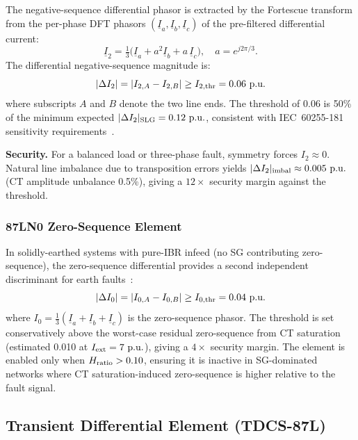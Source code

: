 \documentclass[journal,twoside,10pt]{IEEEtran}
\newcommand{\pu}{\,\text{p.u.}}
\begin{document}
The negative-sequence differential phasor is extracted by the Fortescue
transform from the per-phase DFT phasors $(\underline{I}_a, \underline{I}_b,
\underline{I}_c)$ of the pre-filtered differential current:
\begin{equation}
  \underline{I}_2 = \tfrac{1}{3}\bigl(
    \underline{I}_a + a^2\underline{I}_b + a\,\underline{I}_c\bigr),
  \quad a = e^{j2\pi/3}.
  \label{eq:fortescue}
\end{equation}
The differential negative-sequence magnitude is:
\begin{equation}
  |\Delta I_2| = |{I}_{2,A} - {I}_{2,B}| \geq I_{2,\rm thr} = 0.06\,\pu
  \label{eq:87LN}
\end{equation}
where subscripts $A$ and $B$ denote the two line ends.
The threshold of 0.06\,\pu is 50\% of the minimum expected
$|\Delta I_2|_{\rm SLG} = 0.12\,\pu$, consistent with IEC~60255-181
sensitivity requirements~\cite{IEC_60255_181}.

\textbf{Security.}  For a balanced load or three-phase fault, symmetry
forces $I_2 \approx 0$.  Natural line imbalance due to transposition errors
yields $|\Delta I_2|_{\rm imbal} \approx 0.005\,\pu$ (CT amplitude unbalance
0.5\%), giving a $12\times$ security margin against the threshold.

\subsubsection{87LN0 Zero-Sequence Element}

In solidly-earthed systems with pure-IBR infeed (no SG contributing
zero-sequence), the zero-sequence differential provides a second independent
discriminant for earth faults~\cite{SAMBP_TR22}:
\begin{equation}
  |\Delta I_0| = |{I}_{0,A} - {I}_{0,B}| \geq I_{0,\rm thr} = 0.04\,\pu
  \label{eq:87LN0}
\end{equation}
where $I_0 = \tfrac{1}{3}(\underline{I}_a + \underline{I}_b +
\underline{I}_c)$ is the zero-sequence phasor.
The threshold is set conservatively above the worst-case residual zero-sequence
from CT saturation (estimated 0.010\,\pu at $I_{\rm ext} = 7\,\pu$),
giving a $4\times$ security margin.
The element is enabled only when $H_{\rm ratio} > 0.10$, ensuring it is
inactive in SG-dominated networks where CT saturation-induced zero-sequence
is higher relative to the fault signal.

\subsection{Transient Differential Element (TDCS-87L)}
\label{sec:tdcs}
\end{document}
